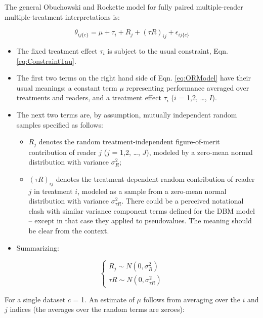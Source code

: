 \documentclass[
]{book}
\providecommand{\tightlist}{%
  \setlength{\itemsep}{0pt}\setlength{\parskip}{0pt}}
\begin{document}
The general Obuchowski and Rockette model for fully paired multiple-reader multiple-treatment interpretations is:

\begin{equation}
\theta_{ij\{c\}}=\mu+\tau_i+R_j+(\tau R)_{ij}+\epsilon_{ij\{c\}}
\label{eq:ORModel}
\end{equation}

\begin{itemize}
\tightlist
\item
  The fixed treatment effect \(\tau_i\) is subject to the usual constraint, Eqn. \eqref{eq:ConstraintTau}.
\item
  The first two terms on the right hand side of Eqn. \eqref{eq:ORModel} have their usual meanings: a constant term \(\mu\) representing performance averaged over treatments and readers, and a treatment effect \(\tau_i\) (\(i\) = 1,2, \ldots, \(I\)).
\item
  The next two terms are, by assumption, mutually independent random samples specified as follows:

  \begin{itemize}
  \tightlist
  \item
    \(R_j\) denotes the random treatment-independent figure-of-merit contribution of reader \(j\) (\(j\) = 1,2, \ldots, \(J\)), modeled by a zero-mean normal distribution with variance \(\sigma_R^2\);
  \item
    \((\tau R)_{ij}\) denotes the treatment-dependent random contribution of reader \(j\) in treatment \(i\), modeled as a sample from a zero-mean normal distribution with variance \(\sigma_{\tau R}^2\). There could be a perceived notational clash with similar variance component terms defined for the DBM model -- except in that case they applied to pseudovalues. The meaning should be clear from the context.
  \end{itemize}
\item
  Summarizing:
\end{itemize}

\begin{equation}
\left\{\begin{matrix}
R_j \sim N(0,\sigma_R^2)\\ 
{\tau R} \sim N(0,\sigma_{\tau R}^2)
\end{matrix}\right.
\label{eq:ORVariances}
\end{equation}

For a single dataset \(c\) = 1. An estimate of \(\mu\) follows from averaging over the \(i\) and \(j\) indices (the averages over the random terms are zeroes):
\end{document}
